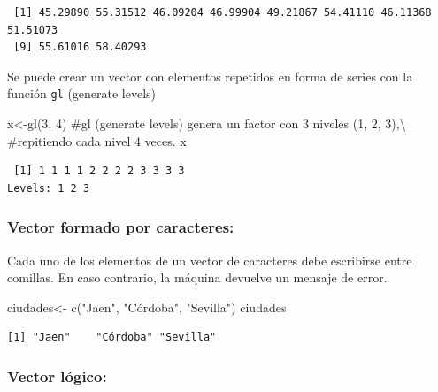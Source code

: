 \documentclass[
  letterpaper,
]{scrbook}
\newenvironment{Shaded}{\begin{snugshade}}{\end{snugshade}}
\newcommand{\CommentTok}[1]{\textcolor[rgb]{0.37,0.37,0.37}{#1}}
\newcommand{\DecValTok}[1]{\textcolor[rgb]{0.68,0.00,0.00}{#1}}
\newcommand{\FunctionTok}[1]{\textcolor[rgb]{0.28,0.35,0.67}{#1}}
\newcommand{\NormalTok}[1]{\textcolor[rgb]{0.00,0.23,0.31}{#1}}
\newcommand{\OtherTok}[1]{\textcolor[rgb]{0.00,0.23,0.31}{#1}}
\newcommand{\StringTok}[1]{\textcolor[rgb]{0.13,0.47,0.30}{#1}}
\begin{document}
\begin{verbatim}
 [1] 45.29890 55.31512 46.09204 46.99904 49.21867 54.41110 46.11368 51.51073
 [9] 55.61016 58.40293
\end{verbatim}

Se puede crear un vector con elementos repetidos en forma de series con
la función \texttt{gl} (generate levels)

\begin{Shaded}
\begin{Highlighting}[]
\NormalTok{x}\OtherTok{\textless{}{-}}\FunctionTok{gl}\NormalTok{(}\DecValTok{3}\NormalTok{, }\DecValTok{4}\NormalTok{) }\CommentTok{\#gl (generate levels) genera un factor con 3 niveles (1, 2, 3),\textbackslash{}}
\CommentTok{\#repitiendo cada nivel 4 veces. }
\NormalTok{x }
\end{Highlighting}
\end{Shaded}

\begin{verbatim}
 [1] 1 1 1 1 2 2 2 2 3 3 3 3
Levels: 1 2 3
\end{verbatim}

\hypertarget{vector-formado-por-caracteres}{%
\subsubsection{Vector formado por
caracteres:}\label{vector-formado-por-caracteres}}

Cada uno de los elementos de un vector de caracteres debe escribirse
entre comillas. En caso contrario, la máquina devuelve un mensaje de
error.

\begin{Shaded}
\begin{Highlighting}[]
\NormalTok{ciudades}\OtherTok{\textless{}{-}} \FunctionTok{c}\NormalTok{(}\StringTok{"Jaen"}\NormalTok{, }\StringTok{"Córdoba"}\NormalTok{, }\StringTok{"Sevilla"}\NormalTok{)}
\NormalTok{ciudades}
\end{Highlighting}
\end{Shaded}

\begin{verbatim}
[1] "Jaen"    "Córdoba" "Sevilla"
\end{verbatim}

\hypertarget{vector-luxf3gico}{%
\subsubsection{Vector lógico:}\label{vector-luxf3gico}}
\end{document}
